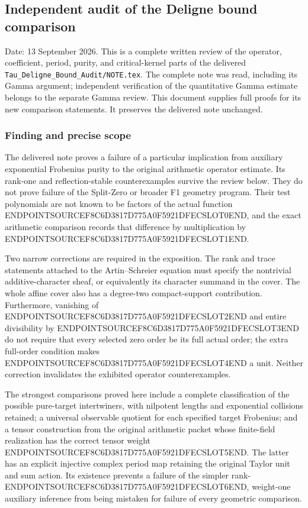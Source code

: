 \subsection{Independent audit of the Deligne bound comparison}\label{endpoint-purity_review--independent-audit-of-the-deligne-bound-comparison}

Date: 13 September 2026. This is a complete written review of the operator, coefficient, period, purity, and critical-kernel parts of the delivered \texttt{Tau\_Deligne\_Bound\_Audit/NOTE.tex}. The complete note was read, including its Gamma argument; independent verification of the quantitative Gamma estimate belongs to the separate Gamma review. This document supplies full proofs for its new comparison statements. It preserves the delivered note unchanged.

\subsubsection{Finding and precise scope}\label{endpoint-purity_review--finding-and-precise-scope}

The delivered note proves a failure of a particular implication from auxiliary exponential Frobenius purity to the original arithmetic operator estimate. Its rank-one and reflection-stable counterexamples survive the review below. They do not prove failure of the Split-Zero or broader F1 geometry program. Their test polynomials are not known to be factors of the actual function ENDPOINTSOURCEF8C6D3817D775A0F5921DFECSLOT0END, and the exact arithmetic comparison records that difference by multiplication by ENDPOINTSOURCEF8C6D3817D775A0F5921DFECSLOT1END.

Two narrow corrections are required in the exposition. The rank and trace statements attached to the Artin--Schreier equation must specify the nontrivial additive-character sheaf, or equivalently its character summand in the cover. The whole affine cover also has a degree-two compact-support contribution. Furthermore, vanishing of ENDPOINTSOURCEF8C6D3817D775A0F5921DFECSLOT2END and entire divisibility by ENDPOINTSOURCEF8C6D3817D775A0F5921DFECSLOT3END do not require that every selected zero order be its full actual order; the extra full-order condition makes ENDPOINTSOURCEF8C6D3817D775A0F5921DFECSLOT4END a unit. Neither correction invalidates the exhibited operator counterexamples.

The strongest comparisons proved here include a complete classification of the possible pure-target intertwiners, with nilpotent lengths and exponential collisions retained; a universal observable quotient for each specified target Frobenius; and a tensor construction from the original arithmetic packet whose finite-field realization has the correct tensor weight ENDPOINTSOURCEF8C6D3817D775A0F5921DFECSLOT5END. The latter has an explicit injective complex period map retaining the original Taylor unit and sum action. Its existence prevents a failure of the simpler rank-ENDPOINTSOURCEF8C6D3817D775A0F5921DFECSLOT6END, weight-one auxiliary inference from being mistaken for failure of every geometric comparison.

